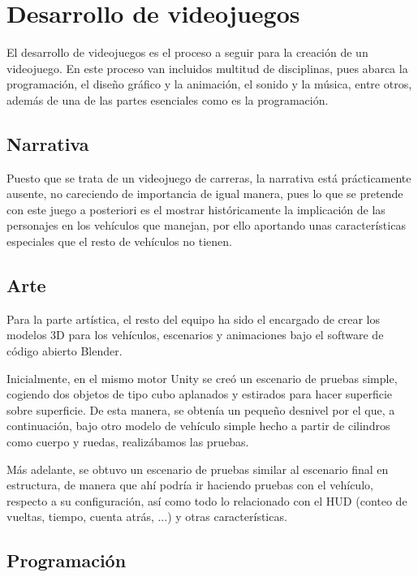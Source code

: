 
\section{Desarrollo de videojuegos}

El desarrollo de videojuegos es el proceso a seguir para la creación de un videojuego. En este proceso van incluidos multitud de disciplinas, pues abarca la programación, el diseño gráfico y la animación, el sonido y la música, entre otros, además de una de las partes esenciales como es la programación.

\subsection{Narrativa}

Puesto que se trata de un videojuego de carreras, la narrativa está prácticamente ausente, no careciendo de importancia de igual manera, pues lo que se pretende con este juego a posteriori es el mostrar históricamente la implicación de las personajes en los vehículos que manejan, por ello aportando unas características especiales que el resto de vehículos no tienen.

\subsection{Arte}

Para la parte artística, el resto del equipo ha sido el encargado de crear los modelos 3D para los vehículos, escenarios y animaciones bajo el software de código abierto Blender. 

Inicialmente, en el mismo motor Unity se creó un escenario de pruebas simple, cogiendo dos objetos de tipo cubo aplanados y estirados para hacer superficie sobre superficie. De esta manera, se obtenía un pequeño desnivel por el que, a continuación, bajo otro modelo de vehículo simple hecho a partir de cilindros como cuerpo y ruedas, realizábamos las pruebas.

Más adelante, se obtuvo un escenario de pruebas similar al escenario final en estructura, de manera que ahí podría ir haciendo pruebas con el vehículo, respecto a su configuración, así como todo lo relacionado con el HUD (conteo de vueltas, tiempo, cuenta atrás, ...) y otras características.

\subsection{Programación}

